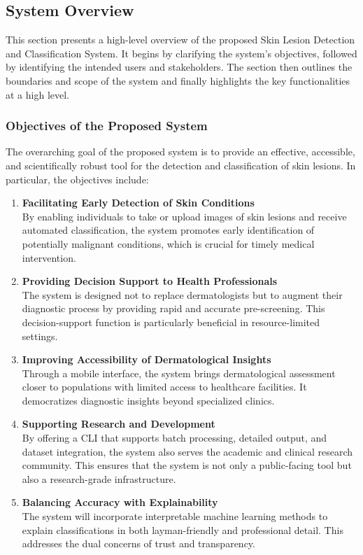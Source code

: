 \documentclass[
  12pt,
  oneside]{article}
\begin{document}
\subsection{System Overview}\label{system-overview}

This section presents a high-level overview of the proposed Skin Lesion
Detection and Classification System. It begins by clarifying the
system's objectives, followed by identifying the intended users and
stakeholders. The section then outlines the boundaries and scope of the
system and finally highlights the key functionalities at a high level.

\subsubsection{Objectives of the Proposed
System}\label{objectives-of-the-proposed-system}

The overarching goal of the proposed system is to provide an effective,
accessible, and scientifically robust tool for the detection and
classification of skin lesions. In particular, the objectives include:

\begin{enumerate}
\def\labelenumi{\arabic{enumi}.}
\item
  \textbf{Facilitating Early Detection of Skin Conditions}\\
  By enabling individuals to take or upload images of skin lesions and
  receive automated classification, the system promotes early
  identification of potentially malignant conditions, which is crucial
  for timely medical intervention.
\item
  \textbf{Providing Decision Support to Health Professionals}\\
  The system is designed not to replace dermatologists but to augment
  their diagnostic process by providing rapid and accurate
  pre-screening. This decision-support function is particularly
  beneficial in resource-limited settings.
\item
  \textbf{Improving Accessibility of Dermatological Insights}\\
  Through a mobile interface, the system brings dermatological
  assessment closer to populations with limited access to healthcare
  facilities. It democratizes diagnostic insights beyond specialized
  clinics.
\item
  \textbf{Supporting Research and Development}\\
  By offering a CLI that supports batch processing, detailed output, and
  dataset integration, the system also serves the academic and clinical
  research community. This ensures that the system is not only a
  public-facing tool but also a research-grade infrastructure.
\item
  \textbf{Balancing Accuracy with Explainability}\\
  The system will incorporate interpretable machine learning methods to
  explain classifications in both layman-friendly and professional
  detail. This addresses the dual concerns of trust and transparency.
\end{enumerate}
\end{document}
